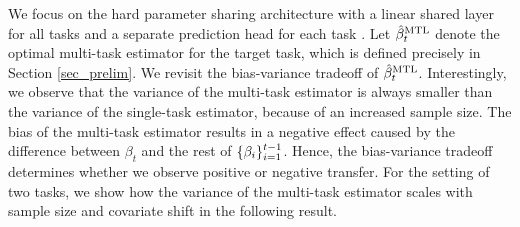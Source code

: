 We focus on the hard parameter sharing architecture with a linear shared layer for all tasks and a separate prediction head for each task \cite{R17,WZR20,MTDNN19}.
Let $\hat{\beta}_t^{\text{MTL}}$ denote the optimal multi-task estimator for the target task, which is defined precisely in Section \ref{sec_prelim}.
We revisit the bias-variance tradeoff of $\hat{\beta}_t^{\text{MTL}}$.
Interestingly, we observe that the variance of the multi-task estimator is always smaller than the variance of the single-task estimator, because of an increased sample size.
The bias of the multi-task estimator results in a negative effect caused by the difference between $\beta_t$ and the rest of $\{\beta_i\}_{i=1}^{t-1}$.
Hence, the bias-variance tradeoff determines whether we observe positive or negative transfer.
For the setting of two tasks, we show how the variance of the multi-task estimator  scales with sample size and covariate shift in the following result.

